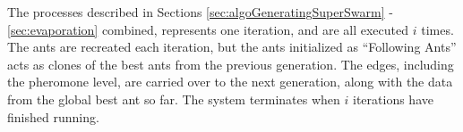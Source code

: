 
The processes described in Sections \ref{sec:algoGeneratingSuperSwarm} - \ref{sec:evaporation} combined, represents one iteration, and are all executed $i$ times. The ants are recreated each iteration, but the ants initialized as ``Following Ants'' acts as clones of the best ants from the previous generation. The edges, including the pheromone level, are carried over to the next generation, along with the data from the global best ant so far. The system terminates when $i$ iterations have finished running. 